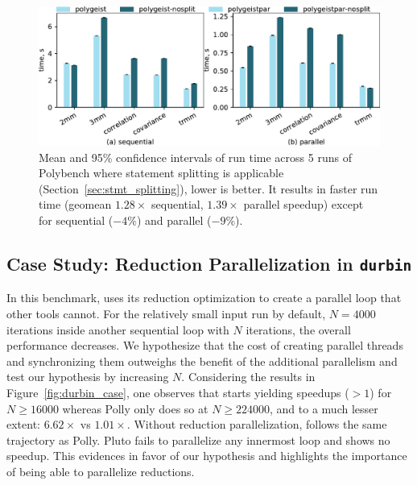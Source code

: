\begin{figure}
  \centering
  \includegraphics[width=\linewidth]{images/split.pdf}
  \caption{Mean and 95\% confidence intervals of run time across 5 runs of Polybench where statement splitting is applicable (Section~\ref{sec:stmt_splitting}), lower is better. It results in faster run time (geomean $1.28\times$ sequential, $1.39\times$ parallel speedup) except for sequential \icode{2mm} ($-4\%$) and parallel  ($-9\%$).}
  \label{fig:split_case}
\end{figure}

\subsection{Case Study: Reduction Parallelization in {\tt durbin}}\label{sec:durbin}
In this benchmark, \tool uses its reduction optimization to create a parallel loop that other tools cannot. For the relatively small input run by default, $N=4000$ iterations inside another sequential loop with $N$ iterations, the overall performance decreases. We hypothesize that the cost of creating parallel threads and synchronizing them outweighs the benefit of the additional parallelism and test our hypothesis by increasing $N$. Considering the results in Figure~\ref{fig:durbin_case}, one observes that \tool starts yielding speedups ($>1$) for $N \geq 16000$ whereas Polly only does so at $N \geq 224000$, and to a much lesser extent: $6.62\times$ vs $1.01\times$. Without reduction parallelization, \tool follows the same trajectory as Polly. Pluto fails to parallelize any innermost loop and shows no speedup. This evidences in favor of our hypothesis and highlights the importance of being able to parallelize reductions.

